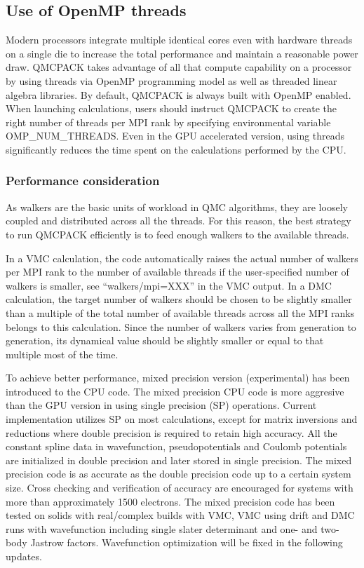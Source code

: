 \subsection{Use of OpenMP threads}
\label{sec:openmprunning}
Modern processors integrate multiple identical cores even with hardware threads
on a single die to increase the total performance and maintain a reasonable
power draw. QMCPACK takes advantage of all that compute capability on a
processor by using threads via OpenMP programming model as well as threaded linear algebra libraries. By default, QMCPACK is always built with OpenMP enabled. When launching calculations, users should instruct QMCPACK to create the right number of threads per MPI rank by specifying environmental variable OMP\_NUM\_THREADS. Even in the GPU accelerated version, using threads significantly reduces the time spent on the calculations performed by the CPU.

\subsubsection{Performance consideration}
\label{sec:cpu:performance}
As walkers are the basic units of workload in QMC algorithms, they are loosely coupled and distributed across all the threads. For this reason, the best strategy to run QMCPACK efficiently is to feed enough walkers to the available threads.

In a VMC calculation, the code automatically raises the actual number of walkers per MPI rank to the number of available threads if the user-specified number of walkers is smaller, see ``walkers/mpi=XXX'' in the VMC output.
In a DMC calculation, the target number of walkers should be chosen to be slightly smaller than a multiple of the total number of available threads across all the MPI ranks belongs to this calculation. Since the number of walkers varies from generation to generation, its dynamical value should be slightly smaller or equal to that multiple most of the time.

To achieve better performance, mixed precision version (experimental) has been introduced to the CPU code. The mixed precision CPU code is more aggresive than the GPU version in using single precision (SP) operations. Current implementation utilizes SP on most calculations, except for matrix inversions and reductions where double precision is required to retain high accuracy. All the constant spline data in wavefunction, pseudopotentials and Coulomb potentials are initialized in double precision and later stored in single precision. The mixed precision code is as accurate as the double precision code up to a certain system size. Cross checking and verification of accuracy are encouraged for systems with more than approximately 1500 electrons. The mixed precision code has been tested on solids with real/complex builds with VMC, VMC using drift and DMC runs with wavefunction including single slater determinant and one- and two-body Jastrow factors. Wavefunction optimization will be fixed in the following updates.

